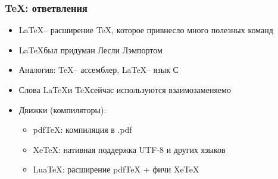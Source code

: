 \begin{frame}

\frametitle{\TeX: ответвления}

\begin{itemize}
    \item \LaTeX -- расширение \TeX, которое привнесло много полезных команд
    \item \LaTeX \enspace был придуман Лесли Лэмпортом
    \item Аналогия: \TeX -- ассемблер, \LaTeX -- язык С
    \item Слова \LaTeX \enspace и \TeX \enspace сейчас используются взаимозаменяемо
    \item Движки (компиляторы):
    \begin{itemize}
        \item pdfTeX: компиляция в .pdf
        \item XeTeX: нативная поддержка UTF-8 и других языков
        \item LuaTeX: расширение pdfTeX + фичи XeTeX
    \end{itemize}
\end{itemize}

\end{frame}
